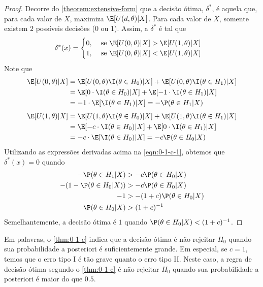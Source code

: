 \begin{proof}
 Decorre do \cref{theorem:extensive-form} que
 a decisão ótima, $\delta^{*}$, é aquela que, 
 para cada valor de $X$, 
 maximiza $\E[U(d,\theta)|X]$.
 Para cada valor de $X$, somente existem 
 $2$ possíveis decisões (0 ou 1).
 Assim, a $\delta^{*}$ é tal que
 \begin{align}
  \label{eqn:0-1-c-1}
  \delta^{*}(x)	&=
  \begin{cases}
   0, & \text{ se } 
   \E[U(0,\theta)|X] > \E[U(1,\theta)|X] \\
   1, & \text{ se } 
   \E[U(0,\theta)|X] < \E[U(1,\theta)|X]
  \end{cases}
 \end{align}
 Note que
 \begin{align*}
  \E[U(0,\theta)|X]	
  &= \E[U(0,\theta)\I(\theta \in H_{0})|X]
  +\E[U(0,\theta)\I(\theta \in H_{1})|X] \\
  &= \E[0 \cdot \I(\theta \in H_{0})|X] 
  +\E[-1 \cdot \I(\theta \in H_{1})|X] \\
  &= -1 \cdot \E[\I(\theta \in H_{1})|X] 
  = -\P(\theta \in H_{1}|X)
 \end{align*}
 \begin{align*}
  \E[U(1,\theta)|X]	
  &= \E[U(1,\theta)\I(\theta \in H_{0})|X] 
  +\E[U(1,\theta)\I(\theta \in H_{1})|X] \\
  &=\E[-c \cdot \I(\theta \in H_{0})|X] 
  +\E[0 \cdot \I(\theta \in H_{1})|X] \\
  &= -c \cdot \E[\I(\theta \in H_{0})|X] 
  =-c\P(\theta \in H_{0}|X)
 \end{align*}
 Utilizando as expressões derivadas acima 
 na \cref{eqn:0-1-c-1},
 obtemos que $\delta^{*}(x) = 0$ quando
 \begin{align*}
  -\P(\theta \in H_{1}|X) 
  &> -c\P(\theta \in H_{0}|X) \\
  -(1-\P(\theta \in H_{0}|X))
  &> -c\P(\theta \in H_{0}|X) \\
  -1 &> -(1+c)\P(\theta \in H_{0}|X) \\
  \P(\theta \in H_{0}|X) &> (1+c)^{-1}
 \end{align*}
 Semelhantemente, a decisão ótima é $1$ 
 quando $\P(\theta \in H_{0}|X)	< (1+c)^{-1}$.
\end{proof}

Em palavras, o \cref{thm:0-1-c} indica que 
a decisão ótima é não rejeitar $H_{0}$ quando 
sua probabilidade a posteriori é 
suficientemente grande.
Em especial, se $c=1$, temos que 
o erro tipo I é tão grave quanto o erro tipo II.
Neste caso, a regra de decisão ótima segundo 
o \cref{thm:0-1-c} é 
não rejeitar $H_{0}$ quando 
sua probabilidade a posteriori é 
maior do que $0.5$.

